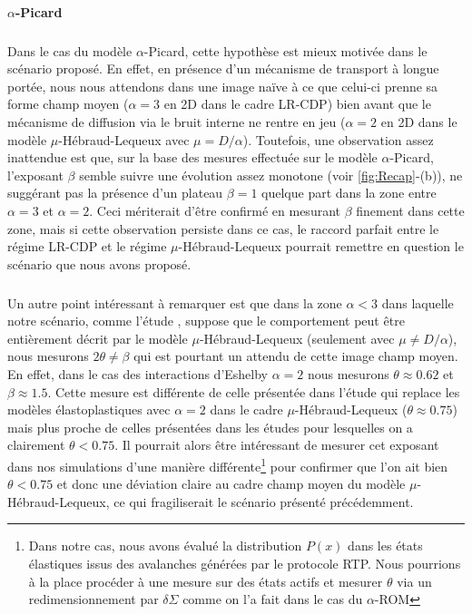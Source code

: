 \paragraph{$\alpha$-Picard}

\subparagraph{}Dans le cas du modèle $\alpha$-Picard, cette hypothèse est mieux motivée dans le scénario proposé. En effet, en présence d'un mécanisme de transport à longue portée, nous nous attendons dans une image naïve à ce que celui-ci prenne sa forme champ moyen ($\alpha = 3$ en 2D dans le cadre LR-CDP) bien avant que le mécanisme de diffusion via le bruit interne ne rentre en jeu ($\alpha = 2$ en 2D dans le modèle $\mu$-Hébraud-Lequeux avec $\mu = D / \alpha$). Toutefois, une observation assez inattendue est que, sur la base des mesures effectuée sur le modèle $\alpha$-Picard, l'exposant $\beta$ semble suivre une évolution assez monotone (voir \autoref{fig:Recap}-(b)), ne suggérant pas la présence d'un plateau $\beta = 1$ quelque part dans la zone entre $\alpha = 3$ et $\alpha = 2$. Ceci mériterait d'être confirmé en mesurant $\beta$ finement dans cette zone, mais si cette observation persiste dans ce cas, le raccord parfait entre le régime LR-CDP et le régime $\mu$-Hébraud-Lequeux pourrait remettre en question le scénario que nous avons proposé.

\subparagraph{}Un autre point intéressant à remarquer est que dans la zone $\alpha < 3$ dans laquelle notre scénario, comme l'étude \cite{ferrero_criticality_2019}, suppose que le comportement peut être entièrement décrit par le modèle $\mu$-Hébraud-Lequeux (seulement avec $\mu \neq D/\alpha$), nous mesurons $2\theta \neq \beta$ qui est pourtant un attendu de cette image champ moyen. En effet, dans le cas des interactions d'Eshelby $\alpha = 2$ nous mesurons $\theta \approx 0.62$ et $\beta \approx 1.5$. Cette mesure est différente de celle présentée dans l'étude \cite{ferrero_criticality_2019} qui replace les modèles élastoplastiques avec $\alpha = 2$ dans le cadre $\mu$-Hébraud-Lequeux ($\theta \approx 0.75$) mais plus proche de celles présentées dans les études \cite{lin_scaling_2014, liu_driving_2016, lin_mean-field_2016} pour lesquelles on a clairement $\theta < 0.75$. Il pourrait alors être intéressant de mesurer cet exposant dans nos simulations d'une manière différente\footnote{Dans notre cas, nous avons évalué la distribution $P(x)$ dans les états élastiques issus des avalanches générées par le protocole RTP. Nous pourrions à la place procéder à une mesure sur des états actifs et mesurer $\theta$ via un redimensionnement par $\delta\Sigma$ comme on l'a fait dans le cas du $\alpha$-ROM} pour confirmer que l'on ait bien $\theta < 0.75$ et donc une déviation claire au cadre champ moyen du modèle $\mu$-Hébraud-Lequeux, ce qui fragiliserait le scénario présenté précédemment.

